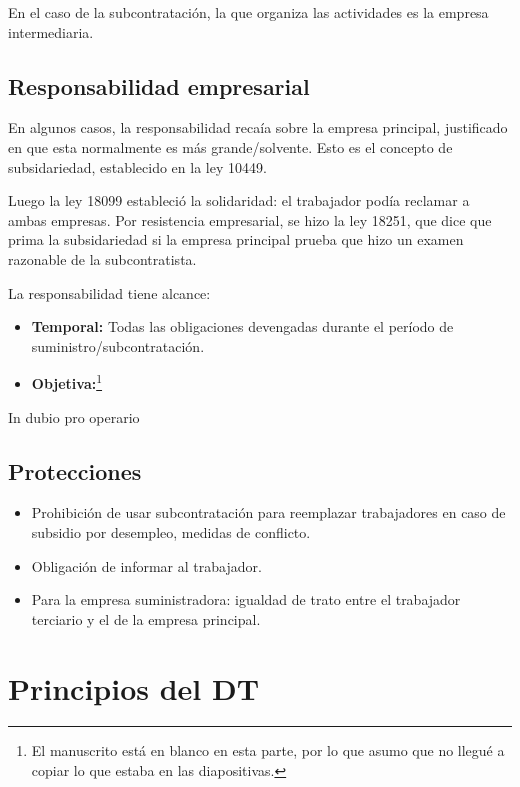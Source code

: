 \documentclass[../main.tex]{subfiles}
\begin{document}
En el caso de la subcontratación, la que organiza las actividades es la empresa intermediaria.

\subsection{Responsabilidad empresarial}

En algunos casos, la responsabilidad recaía sobre la empresa principal, justificado en que esta normalmente es más grande/solvente.
Esto es el concepto de subsidariedad, establecido en la ley 10449.

Luego la ley 18099 estableció la solidaridad: el trabajador podía reclamar a ambas empresas.
Por resistencia empresarial, se hizo la ley 18251, que dice que prima la subsidariedad si la empresa principal prueba que hizo un examen razonable de la subcontratista.

La responsabilidad tiene alcance:

\begin{itemize}
	\item \textbf{Temporal:} Todas las obligaciones devengadas durante el período de suministro/subcontratación.
	
	\item \textbf{Objetiva:}\footnote{El manuscrito está en blanco en esta parte, por lo que asumo que no llegué a copiar lo que estaba en las diapositivas.}
\end{itemize}In dubio pro operario

\subsection{Protecciones}

\begin{itemize}
	\item Prohibición de usar subcontratación para reemplazar trabajadores en caso de subsidio por desempleo, medidas de conflicto.

	\item Obligación de informar al trabajador.
	
	\item Para la empresa suministradora: igualdad de trato entre el trabajador terciario y el de la empresa principal.
\end{itemize}

\section{Principios del DT}
\end{document}
